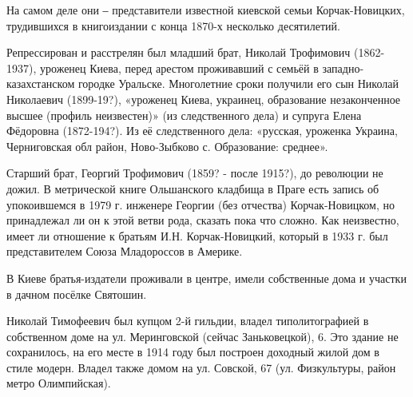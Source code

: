 \raggedcolumns
\begin{multicols}{2} %
\setlength{\parindent}{0pt}

\end{multicols} %

На самом деле они ‒ представители известной киевской семьи Корчак-Новицких,
трудившихся в книгоиздании с конца 1870-х несколько десятилетий. 


Репрессирован и расстрелян был младший брат, Николай Трофимович (1862-1937),
уроженец Киева, перед арестом проживавший с семьёй в западно-казахстанском
городке Уральске. Многолетние сроки получили его сын Николай Николаевич
(1899-19?), «уроженец Киева, украинец, образование незаконченное высшее
(профиль неизвестен)» (из следственного дела) и супруга Елена Фёдоровна
(1872-194?). Из её следственного дела: «русская, уроженка Украина, Черниговская
обл район, Ново-Зыбково с. Образование: среднее».


Старший брат, Георгий Трофимович (1859? - после 1915?), до революции не дожил.
В метрической книге Ольшанского кладбища в Праге есть запись об упокоившемся в
1979 г. инженере Георгии (без отчества) Корчак-Новицком, но принадлежал ли он к
этой ветви рода, сказать пока что сложно. Как неизвестно, имеет ли отношение к
братьям И.Н. Корчак-Новицкий, который в 1933 г. был представителем Союза
Младороссов в Америке. 


В Киеве братья-издатели проживали в центре, имели собственные дома и участки в
дачном посёлке Святошин. 

\vspace{0.5cm}

Николай Тимофеевич был купцом 2-й гильдии, владел типолитографией в собственном
доме на ул. Меринговской (сейчас Заньковецкой), 6. Это здание не сохранилось,
на его месте в 1914 году был построен доходный жилой дом в стиле модерн.
Владел также домом на ул. Совской, 67 (ул. Физкультуры, район метро
Олимпийская). 

